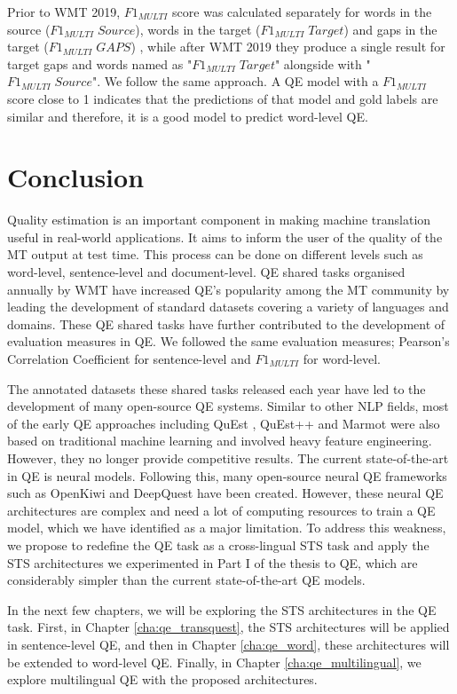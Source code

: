 Prior to WMT 2019, $F1_{\textit{MULTI}}$ score was calculated separately for words in the source ($F1_{\textit{MULTI}} \; Source$), words in the target ($F1_{\textit{MULTI}} \; Target$) and gaps in the target ($F1_{\textit{MULTI}} \; GAPS$) \autocite{specia-etal-2018-findings}, while after WMT 2019 \autocite{fonseca-etal-2019-findings,specia-etal-2020-findings-wmt} they produce a single result for target gaps and words named as "$F1_{\textit{MULTI}} \; Target$" alongside with "$F1_{\textit{MULTI}} \; Source$". We follow the same approach.  A QE model with a $F1_{\textit{MULTI}}$ score close to 1 indicates that the predictions of that model and gold labels are similar and therefore, it is a good model to predict word-level QE.    

\section{Conclusion}
\label{sec:qe_conclusion}
Quality estimation is an important component in making machine translation useful in real-world applications. It aims to inform the user of the quality of the MT output at test time. This process can be done on different levels such as word-level, sentence-level and document-level. QE shared tasks organised annually by WMT have increased QE's popularity among the MT community by leading the development of standard datasets covering a variety of languages and domains. These QE shared tasks have further contributed to the development of evaluation measures in QE.  We followed the same evaluation measures; Pearson's Correlation Coefficient for sentence-level and $F1_{\textit{MULTI}}$ for word-level.

The annotated datasets these shared tasks released each year have led to the development of many open-source QE systems. Similar to other NLP fields, most of the early QE approaches including QuEst \autocite{specia-etal-2013-quest}, QuEst++ \autocite{specia-etal-2015-multi} and Marmot \autocite{logacheva-etal-2016-marmot} were also based on traditional machine learning and involved heavy feature engineering. However, they no longer provide competitive results. The current state-of-the-art in QE is neural models. Following this, many open-source neural QE frameworks such as OpenKiwi \autocite{kepler-etal-2019-openkiwi} and DeepQuest \autocite{ive-etal-2018-deepquest} have been created. However, these neural QE architectures are complex and need a lot of computing resources to train a QE model, which we have identified as a major limitation. To address this weakness, we propose to redefine the QE task as a cross-lingual STS task and apply the STS architectures we experimented in Part I of the thesis to QE, which are considerably simpler than the current state-of-the-art QE models.

In the next few chapters, we will be exploring the STS architectures in the QE task. First, in Chapter \ref{cha:qe_transquest}, the STS architectures will be applied in sentence-level QE, and then in Chapter \ref{cha:qe_word}, these architectures will be extended to word-level QE. Finally, in Chapter \ref{cha:qe_multilingual}, we explore multilingual QE with the proposed architectures.
